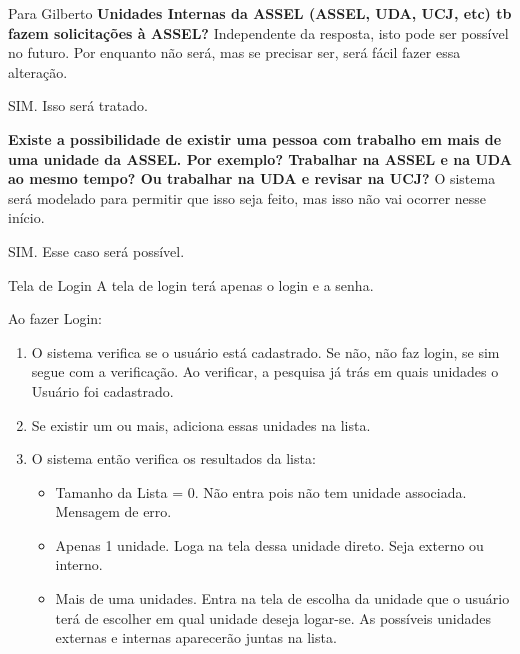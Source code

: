 	\begin{pergunta}[1]{Para Gilberto}
		\mssim \textbf{Unidades Internas da ASSEL (ASSEL, UDA, UCJ, etc) tb fazem solicitações à ASSEL?} Independente da resposta, isto pode ser possível no futuro. Por enquanto não será, mas se precisar ser, será fácil fazer essa alteração.	
		
		SIM. Isso será tratado.

		
		\mssim \textbf{Existe a possibilidade de existir uma pessoa com trabalho em mais de uma unidade da ASSEL. Por exemplo? Trabalhar na ASSEL e na UDA ao mesmo tempo? Ou trabalhar na UDA e revisar na UCJ?} O sistema será modelado para permitir que isso seja feito, mas isso não vai ocorrer nesse início.		
		
		SIM. Esse caso será possível.
		
	\end{pergunta}	

	
	\begin{imagine}{Tela de Login}
		A tela de login terá apenas o login e a senha.
		
		Ao fazer Login:

		\begin{enumerate}

		
		\item O sistema verifica se o usuário está cadastrado. Se não, não faz login, se sim segue com a verificação. Ao verificar, a pesquisa já trás em quais unidades o Usuário foi cadastrado.
		
		\item  Se existir um ou mais, adiciona essas unidades na lista.
		
		\item O sistema então verifica os resultados da lista:
		
		\begin{itemize}
			\item Tamanho da Lista = 0. Não entra pois não tem unidade associada. Mensagem de erro.
			
			\item Apenas 1 unidade. Loga na tela dessa unidade direto. Seja externo ou interno.
			
			\item Mais de uma unidades. Entra na tela de escolha da unidade que o usuário terá de escolher em qual unidade deseja logar-se. As possíveis unidades externas e internas aparecerão juntas na lista.
		\end{itemize}	

		\end{enumerate}
	\end{imagine} 

